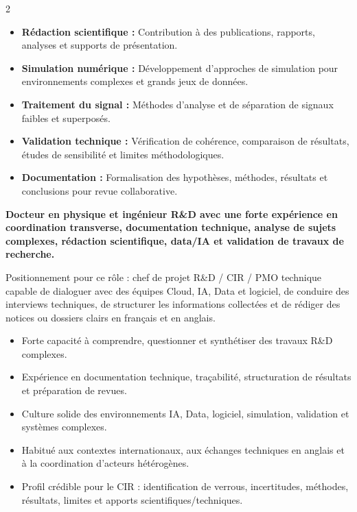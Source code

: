 \documentclass[8pt,a4paper,ragged2e,withhyper]{altacv}
\begin{document}
\begin{paracol}{2}
\begin{itemize}
  \item \textbf{Rédaction scientifique :} Contribution à des publications, rapports, analyses et supports de présentation.
  \item \textbf{Simulation numérique :} Développement d’approches de simulation pour environnements complexes et grands jeux de données.
  \item \textbf{Traitement du signal :} Méthodes d’analyse et de séparation de signaux faibles et superposés.
  \item \textbf{Validation technique :} Vérification de cohérence, comparaison de résultats, études de sensibilité et limites méthodologiques.
  \item \textbf{Documentation :} Formalisation des hypothèses, méthodes, résultats et conclusions pour revue collaborative.
\end{itemize}

\switchcolumn


\textbf{Docteur en physique et ingénieur R\&D avec une forte expérience en coordination transverse, documentation technique, analyse de sujets complexes, rédaction scientifique, data/IA et validation de travaux de recherche.}

Positionnement pour ce rôle : chef de projet R\&D / CIR / PMO technique capable de dialoguer avec des équipes Cloud, IA, Data et logiciel, de conduire des interviews techniques, de structurer les informations collectées et de rédiger des notices ou dossiers clairs en français et en anglais.

\begin{itemize}
  \item Forte capacité à comprendre, questionner et synthétiser des travaux R\&D complexes.
  \item Expérience en documentation technique, traçabilité, structuration de résultats et préparation de revues.
  \item Culture solide des environnements IA, Data, logiciel, simulation, validation et systèmes complexes.
  \item Habitué aux contextes internationaux, aux échanges techniques en anglais et à la coordination d’acteurs hétérogènes.
  \item Profil crédible pour le CIR : identification de verrous, incertitudes, méthodes, résultats, limites et apports scientifiques/techniques.
\end{itemize}


\end{paracol}
\end{document}
